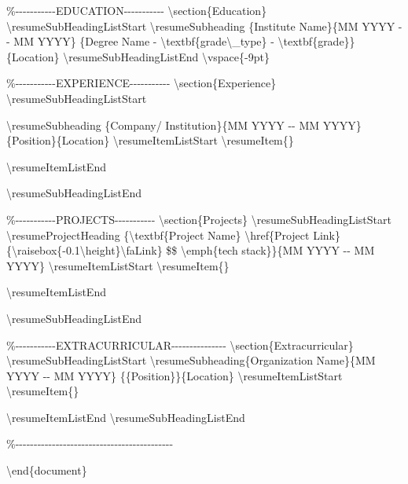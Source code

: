 \%-\/-\/-\/-\/-\/-\/-\/-\/-\/-\/-EDUCATION-\/-\/-\/-\/-\/-\/-\/-\/-\/-\/-
\textbackslash section\{Education\}
\textbackslash resumeSubHeadingListStart \textbackslash resumeSubheading
\{Institute Name\}\{MM YYYY -\/- MM YYYY\} \{Degree Name -
\textbackslash textbf\{grade\textbackslash\_type\} -
\textbackslash textbf\{grade\}\}\{Location\}
\textbackslash resumeSubHeadingListEnd \textbackslash vspace\{-9pt\}

\%-\/-\/-\/-\/-\/-\/-\/-\/-\/-\/-EXPERIENCE-\/-\/-\/-\/-\/-\/-\/-\/-\/-\/-
\textbackslash section\{Experience\}
\textbackslash resumeSubHeadingListStart

\textbackslash resumeSubheading \{Company/ Institution\}\{MM YYYY -\/-
MM YYYY\} \{Position\}\{Location\} \textbackslash resumeItemListStart
\textbackslash resumeItem\{\}

\textbackslash resumeItemListEnd

\textbackslash resumeSubHeadingListEnd

\%-\/-\/-\/-\/-\/-\/-\/-\/-\/-\/-PROJECTS-\/-\/-\/-\/-\/-\/-\/-\/-\/-\/-
\textbackslash section\{Projects\}
\textbackslash resumeSubHeadingListStart
\textbackslash resumeProjectHeading \{\textbackslash textbf\{Project
Name\} \textbackslash href\{Project
Link\}\{\textbackslash raisebox\{-0.1\textbackslash height\}\textbackslash faLink\}
\$\textbar\$ \textbackslash emph\{tech stack\}\}\{MM YYYY -\/- MM YYYY\}
\textbackslash resumeItemListStart \textbackslash resumeItem\{\}

\textbackslash resumeItemListEnd

\textbackslash resumeSubHeadingListEnd

\%-\/-\/-\/-\/-\/-\/-\/-\/-\/-\/-EXTRACURRICULAR-\/-\/-\/-\/-\/-\/-\/-\/-\/-\/-\/-\/-\/-\/-
\textbackslash section\{Extracurricular\}
\textbackslash resumeSubHeadingListStart
\textbackslash resumeSubheading\{Organization Name\}\{MM YYYY -\/- MM
YYYY\} \{\{Position\}\}\{Location\} \textbackslash resumeItemListStart
\textbackslash resumeItem\{\}

\textbackslash resumeItemListEnd \textbackslash resumeSubHeadingListEnd

\%-\/-\/-\/-\/-\/-\/-\/-\/-\/-\/-\/-\/-\/-\/-\/-\/-\/-\/-\/-\/-\/-\/-\/-\/-\/-\/-\/-\/-\/-\/-\/-\/-\/-\/-\/-\/-\/-\/-\/-\/-\/-\/-

\textbackslash end\{document\}
